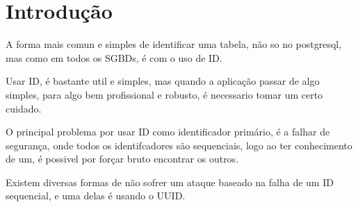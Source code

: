\section{Introdução}
A forma mais comun e simples de identificar uma tabela, não so no postgresql, mas como em todos os SGBDs, é com o uso de ID.

Usar ID, é bastante util e simples, mas quando a aplicação passar de algo simples, para algo bem profissional e robusto, 
é necessario tomar um certo cuidado.

O principal problema por usar ID como identificador primário, é a falhar de segurança, onde todos os identifcadores são sequenciais,
logo ao ter conhecimento de um, é possivel por forçar bruto encontrar os outros.

Existem diversas formas de não sofrer um ataque baseado na falha de um ID sequencial, e uma delas é usando o UUID.